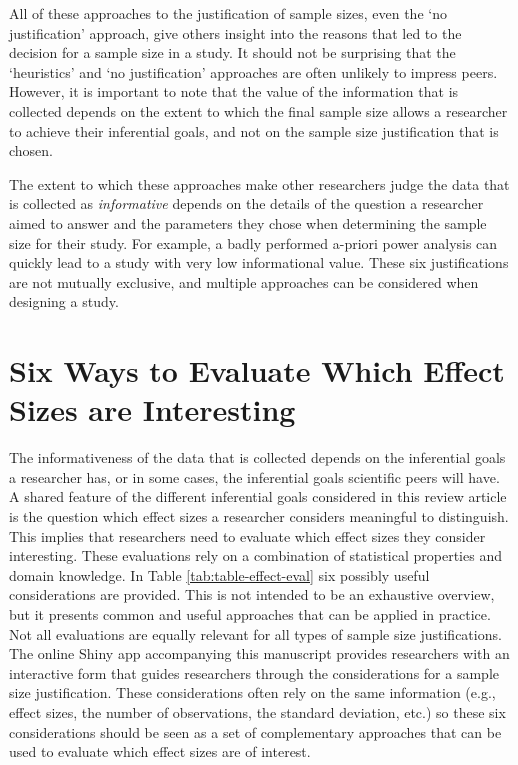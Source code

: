 \documentclass[
  oneside]{book}
\begin{document}
All of these approaches to the justification of sample sizes, even the `no justification' approach, give others insight into the reasons that led to the decision for a sample size in a study. It should not be surprising that the `heuristics' and `no justification' approaches are often unlikely to impress peers. However, it is important to note that the value of the information that is collected depends on the extent to which the final sample size allows a researcher to achieve their inferential goals, and not on the sample size justification that is chosen.

The extent to which these approaches make other researchers judge the data that is collected as \emph{informative} depends on the details of the question a researcher aimed to answer and the parameters they chose when determining the sample size for their study. For example, a badly performed a-priori power analysis can quickly lead to a study with very low informational value. These six justifications are not mutually exclusive, and multiple approaches can be considered when designing a study.

\hypertarget{six-ways-to-evaluate-which-effect-sizes-are-interesting}{%
\section{Six Ways to Evaluate Which Effect Sizes are Interesting}\label{six-ways-to-evaluate-which-effect-sizes-are-interesting}}

The informativeness of the data that is collected depends on the inferential goals a researcher has, or in some cases, the inferential goals scientific peers will have. A shared feature of the different inferential goals considered in this review article is the question which effect sizes a researcher considers meaningful to distinguish. This implies that researchers need to evaluate which effect sizes they consider interesting. These evaluations rely on a combination of statistical properties and domain knowledge. In Table \ref{tab:table-effect-eval} six possibly useful considerations are provided. This is not intended to be an exhaustive overview, but it presents common and useful approaches that can be applied in practice. Not all evaluations are equally relevant for all types of sample size justifications. The online Shiny app accompanying this manuscript provides researchers with an interactive form that guides researchers through the considerations for a sample size justification. These considerations often rely on the same information (e.g., effect sizes, the number of observations, the standard deviation, etc.) so these six considerations should be seen as a set of complementary approaches that can be used to evaluate which effect sizes are of interest.
\end{document}
